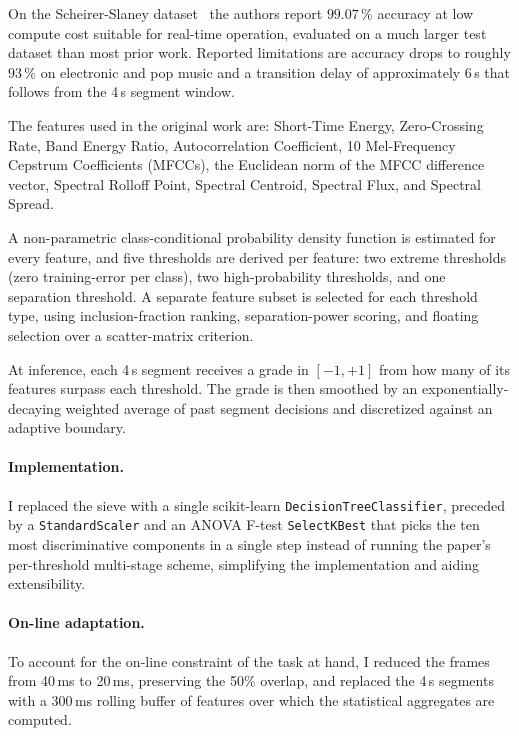 On the Scheirer-Slaney dataset~\cite{scheirer1997discriminator} the authors report $99.07\,\%$ accuracy at low compute cost suitable for real-time operation, evaluated on a much larger test dataset than most prior work.
Reported limitations are accuracy drops to roughly $93\,\%$ on electronic and pop music and a transition delay of approximately $6$\,s that follows from the 4\,s segment window.

The features used in the original work are: Short-Time Energy, Zero-Crossing Rate, Band Energy Ratio, Autocorrelation Coefficient, 10 Mel-Frequency Cepstrum Coefficients (MFCCs), the Euclidean norm of the MFCC difference vector, Spectral Rolloff Point, Spectral Centroid, Spectral Flux, and Spectral Spread.

A non-parametric class-conditional probability density function is estimated for every feature, and five thresholds are derived per feature: two extreme thresholds (zero training-error per class), two high-probability thresholds, and one separation threshold.
A separate feature subset is selected for each threshold type, using inclusion-fraction ranking, separation-power scoring, and floating selection over a scatter-matrix criterion.

At inference, each 4\,s segment receives a grade in $[-1, +1]$ from how many of its features surpass each threshold.
The grade is then smoothed by an exponentially-decaying weighted average of past segment decisions and discretized against an adaptive boundary.

\paragraph{Implementation.}
I replaced the sieve with a single scikit-learn \texttt{DecisionTreeClassifier}, preceded by a \texttt{StandardScaler} and an ANOVA F-test \texttt{SelectKBest} that picks the ten most discriminative components in a single step instead of running the paper's per-threshold multi-stage scheme, simplifying the implementation and aiding extensibility.

\paragraph{On-line adaptation.}
To account for the on-line constraint of the task at hand, I reduced the frames from 40\,ms to 20\,ms, preserving the 50\% overlap, and replaced the 4\,s segments with a 300\,ms rolling buffer of features over which the statistical aggregates are computed.

